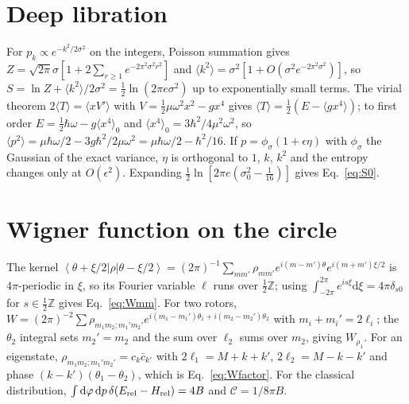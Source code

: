 \documentclass[pra,twocolumn,superscriptaddress,longbibliography,floatfix]{revtex4-2}
\newcommand{\ket}[1]{\left|#1\right\rangle}
\newcommand{\bra}[1]{\left\langle#1\right|}
\newcommand{\dd}{\mathrm{d}}
\newcommand{\Erel}{E_{\rm rel}}
\begin{document}
\section{Deep libration}
\label{app:lib}

For $p_{k}\propto e^{-k^{2}/2\sigma^{2}}$ on the integers, Poisson summation gives
$Z=\sqrt{2\pi}\sigma[1+2\sum_{r\ge1}e^{-2\pi^{2}\sigma^{2}r^{2}}]$ and
$\langle k^{2}\rangle=\sigma^{2}[1+O(\sigma^{2}e^{-2\pi^{2}\sigma^{2}})]$, so
$S=\ln Z+\langle k^{2}\rangle/2\sigma^{2}=\tfrac12\ln(2\pi e\sigma^{2})$ up to
exponentially small terms. The virial theorem $2\langle T\rangle=\langle xV'\rangle$
with $V=\tfrac12\mu\omega^{2}x^{2}-gx^{4}$ gives
$\langle T\rangle=\tfrac12(E-\langle gx^{4}\rangle)$; to first order
$E=\tfrac12\hbar\omega-g\langle x^{4}\rangle_{0}$ and
$\langle x^{4}\rangle_{0}=3\hbar^{2}/4\mu^{2}\omega^{2}$, so
$\langle p^{2}\rangle=\mu\hbar\omega/2-3g\hbar^{2}/2\mu\omega^{2}
=\mu\hbar\omega/2-\hbar^{2}/16$. If $p=\phi_{\sigma}(1+\epsilon\eta)$ with
$\phi_{\sigma}$ the Gaussian of the exact variance, $\eta$ is orthogonal to $1$,
$k$, $k^{2}$ and the entropy changes only at $O(\epsilon^{2})$. Expanding
$\tfrac12\ln[2\pi e(\sigma_{0}^{2}-\tfrac1{16})]$ gives Eq.~\eqref{eq:S0}.

\section{Wigner function on the circle}
\label{app:wigner}

The kernel $\bra{\theta+\xi/2}\rho\ket{\theta-\xi/2}=(2\pi)^{-1}\sum_{mm'}
\rho_{mm'}e^{i(m-m')\theta}e^{i(m+m')\xi/2}$ is $4\pi$-periodic in $\xi$, so its
Fourier variable $\ell$ runs over $\tfrac12\mathbb{Z}$; using
$\int_{-2\pi}^{2\pi}e^{is\xi}\dd\xi=4\pi\delta_{s0}$ for $s\in\tfrac12\mathbb{Z}$
gives Eq.~\eqref{eq:Wmm}. For two rotors,
$W=(2\pi)^{-2}\sum\rho_{m_{1}m_{2};m_{1}'m_{2}'}
e^{i(m_{1}-m_{1}')\theta_{1}+i(m_{2}-m_{2}')\theta_{2}}$ with
$m_{i}+m_{i}'=2\ell_{i}$; the $\theta_{2}$ integral sets $m_{2}'=m_{2}$ and the
sum over $\ell_{2}$ sums over $m_{2}$, giving $W_{\rho_{1}}$. For an eigenstate,
$\rho_{m_{1}m_{2};m_{1}'m_{2}'}=c_{k}\bar c_{k'}$ with $2\ell_{1}=M+k+k'$,
$2\ell_{2}=M-k-k'$ and phase $(k-k')(\theta_{1}-\theta_{2})$, which is
Eq.~\eqref{eq:Wfactor}. For the classical distribution,
$\int\dd\varphi\,\dd p\,\delta(\Erel-H_{\rm rel})=4B$ and $\mathcal{C}=1/8\pi B$.
\end{document}

